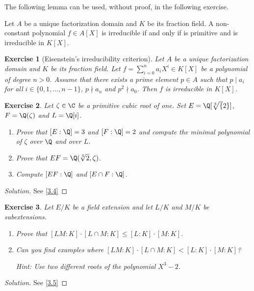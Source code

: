 \documentclass[a4paper,10pt,reqno]{amsart}
\newtheorem{ex}{Exercise}[section]
\newenvironment{sol}
  {\renewcommand\qedsymbol{$\blacksquare$}\begin{proof}[Solution]}
  {\end{proof}}
\begin{document}
The following lemma can be used, without proof, in the following exercise.

\begin{lem*}
    Let $A$ be a unique factorization domain and $K$ be its fraction field.
    A non-constant polynomial $f\in A[X]$ is irreducible if and only if is primitive and is irreducible in $K[X]$.
\end{lem*}

\begin{ex} [Eisenstein's irreducibility criterion]\label{2.3}
    Let $A$ be a unique factorization domain and $K$ be its fraction field.
    Let $f=\sum_{i=0}^n a_iX^i\in K[X]$ be a polynomial of degree $n>0$. 
    Assume that there exists a prime element $p\in A$ such that
    $p\mid a_i$ for all $i\in\{0,1,\dots,n-1\}$, $p\nmid a_n$ and
    $p^2\nmid a_0$. Then $f$ is irreducible in $K[X]$. 
\end{ex}


\begin{ex}
\label{2.4}
Let $\zeta\in\C$ be a primitive cubic root of one.
Set $E=\Q[\sqrt[3]{2}]$, $F=\Q(\zeta)$ and $L=\Q[i]$.
\begin{enumerate}[label=(\roman*)]
    \item Prove that $[E:\Q]=3$ and $[F:\Q]=2$ and compute the minimal polynomial of $\zeta$ over $\Q$ and over $L$.
    \item Prove that $EF=\Q(\sqrt[3]{2},\zeta)$.
    \item Compute $[EF:\Q]$ and $[E\cap F:\Q]$.
\end{enumerate}  
\end{ex}
\begin{sol}
    See \cref{3.4}
\end{sol}

\begin{ex}\label{2.5}
    Let $E/K$ be a field extension and let $L/K$ and $M/K$ be subextensions.
    \begin{enumerate}[label=(\roman*)]
    \item Prove that $[LM : K ] \cdot [L \cap M : K] \leq [L:K] \cdot [M:K]$.
    \item Can you find examples where $[LM : K ] \cdot [L \cap M : K] < [L:K] \cdot [M:K]$?
    
    \noindent \textit{Hint:} Use two different roots of the polynomial $X^3 -2$.
    \end{enumerate}  
\end{ex}
\begin{sol}
    See \cref{3.5}
\end{sol}
\end{document}
